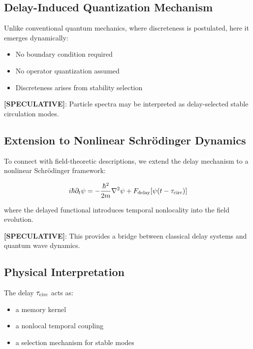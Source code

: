 \documentclass[11pt]{article}
\theoremstyle{definition}
\theoremstyle{plain}
\theoremstyle{remark}
\begin{document}
    \subsection{Delay-Induced Quantization Mechanism}
        
        Unlike conventional quantum mechanics, where discreteness is postulated, here it emerges dynamically:
        
        \begin{itemize}
            \item No boundary condition required
            \item No operator quantization assumed
            \item Discreteness arises from stability selection
        \end{itemize}
        
        \textbf{[SPECULATIVE]}: Particle spectra may be interpreted as delay-selected stable circulation modes.
    
    \subsection{Extension to Nonlinear Schrödinger Dynamics}
        
        To connect with field-theoretic descriptions, we extend the delay mechanism to a nonlinear Schrödinger framework:
        
        \begin{align}
            i \hbar \partial_t \psi = -\frac{\hbar^2}{2m} \nabla^2 \psi + F_{\text{delay}}[\psi(t - \tau_{\rm circ})]
        \end{align}
        
        where the delayed functional introduces temporal nonlocality into the field evolution.
        
        \textbf{[SPECULATIVE]}: This provides a bridge between classical delay systems and quantum wave dynamics.
    
    \subsection{Physical Interpretation}
        
        The delay $\tau_{\rm circ}$ acts as:
        
        \begin{itemize}
            \item a memory kernel
            \item a nonlocal temporal coupling
            \item a selection mechanism for stable modes
        \end{itemize}
        
\end{document}

